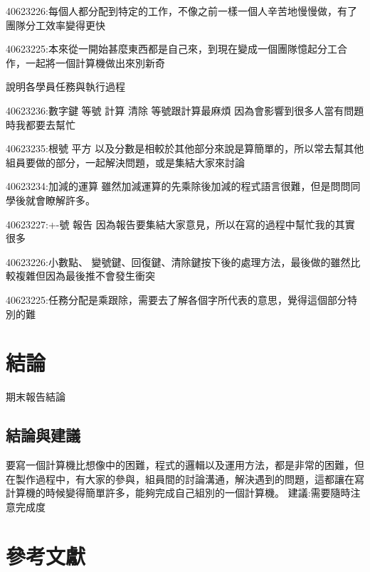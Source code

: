 \documentclass[12pt,,]{report}
\begin{document}
40623226:每個人都分配到特定的工作，不像之前一樣一個人辛苦地慢慢做，有了團隊分工效率變得更快

40623225:本來從一開始甚麼東西都是自己來，到現在變成一個團隊憶起分工合作，一起將一個計算機做出來別新奇

說明各學員任務與執行過程

40623236:數字鍵 等號 計算 清除 等號跟計算最麻煩
因為會影響到很多人當有問題時我都要去幫忙

40623235:根號 平方
以及分數是相較於其他部分來說是算簡單的，所以常去幫其他組員要做的部分，一起解決問題，或是集結大家來討論

40623234:加減的運算
雖然加減運算的先乘除後加減的程式語言很難，但是問問同學後就會瞭解許多。

40623227:+-號 報告
因為報告要集結大家意見，所以在寫的過程中幫忙我的其實很多

40623226:小數點、
變號鍵、回復鍵、清除鍵按下後的處理方法，最後做的雖然比較複雜但因為最後推不會發生衝突

40623225:任務分配是乘跟除，需要去了解各個字所代表的意思，覺得這個部分特別的難

\hypertarget{ux7d50ux8ad6}{%
\chapter{結論}\label{ux7d50ux8ad6}}

期末報告結論

\hypertarget{ux7d50ux8ad6ux8207ux5efaux8b70}{%
\section{結論與建議}\label{ux7d50ux8ad6ux8207ux5efaux8b70}}

要寫一個計算機比想像中的困難，程式的邏輯以及運用方法，都是非常的困難，但在製作過程中，有大家的參與，組員間的討論溝通，解決遇到的問題，這都讓在寫計算機的時候變得簡單許多，能夠完成自己組別的一個計算機。
建議:需要隨時注意完成度

\hypertarget{ux53c3ux8003ux6587ux737b}{%
\chapter{參考文獻}\label{ux53c3ux8003ux6587ux737b}}
\end{document}
